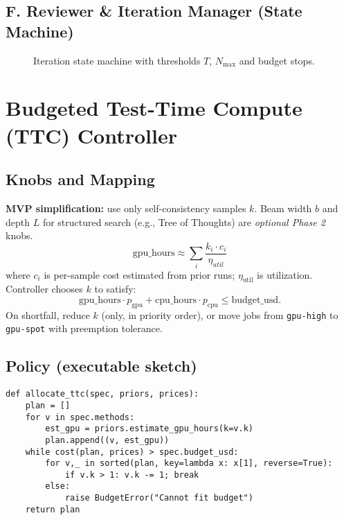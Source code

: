 \subsection{F. Reviewer \& Iteration Manager (State Machine)}
\begin{figure}[h]
\centering
{}
\caption{Iteration state machine with thresholds \(T\), \(N_{\max}\) and budget stops.}
\end{figure}

\section{Budgeted Test-Time Compute (TTC) Controller}
\subsection{Knobs and Mapping}
\textbf{MVP simplification:} use only self-consistency samples \(k\). Beam width \(b\) and depth \(L\) for structured search (e.g., Tree of Thoughts) are \textit{optional Phase 2} knobs.
\[\mathrm{gpu\_hours} \approx \sum_{i} \frac{k_i \cdot c_i}{\eta_{util}}\]
where \(c_i\) is per-sample cost estimated from prior runs; \(\eta_{\text{util}}\) is utilization. Controller chooses \(k\) to satisfy:
\[
\text{gpu\_hours} \cdot p_{\text{gpu}} + \text{cpu\_hours} \cdot p_{\text{cpu}} \le \text{budget\_usd}.
\]
On shortfall, reduce \(k\) (only, in priority order), or move jobs from \texttt{gpu-high} to \texttt{gpu-spot} with preemption tolerance.

\subsection{Policy (executable sketch)}
\begin{lstlisting}[style=code,caption={Budget controller pseudocode (MVP k-only)}]
def allocate_ttc(spec, priors, prices):
    plan = []
    for v in spec.methods:
        est_gpu = priors.estimate_gpu_hours(k=v.k)
        plan.append((v, est_gpu))
    while cost(plan, prices) > spec.budget_usd:
        for v,_ in sorted(plan, key=lambda x: x[1], reverse=True):
            if v.k > 1: v.k -= 1; break
        else:
            raise BudgetError("Cannot fit budget")
    return plan
\end{lstlisting}

